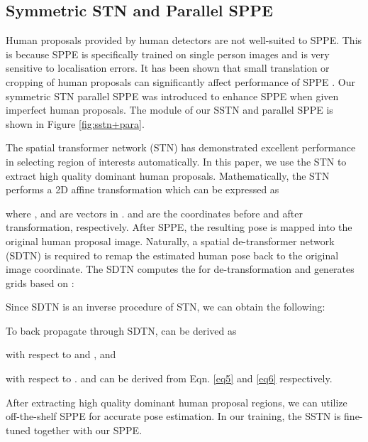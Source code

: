 \documentclass[10pt,twocolumn,letterpaper]{article}
\begin{document}
\subsection{Symmetric STN and Parallel SPPE}
Human proposals provided by human detectors are not well-suited to SPPE. This is because SPPE is specifically trained on single person images and is very sensitive to localisation errors. It has been shown that small translation or cropping of human proposals can significantly affect performance of SPPE \cite{newell2016stacked}. Our symmetric STN  parallel SPPE was introduced to enhance SPPE when given imperfect human proposals. The module of our SSTN and parallel SPPE is shown in Figure \ref{fig:sstn+para}.

\vspace{2mm}
 The spatial transformer network \cite{jaderberg2015spatial}(STN) has demonstrated excellent performance
in selecting region of interests automatically. In this paper, we use the STN to extract high quality dominant human proposals. Mathematically, the STN performs a 2D affine transformation which can be expressed as

where ,  and  are vectors in .  and  are the coordinates before and after transformation, respectively. After SPPE, the resulting pose is mapped into the original human proposal image. Naturally, a spatial de-transformer network (SDTN) is required to remap the estimated human pose back to the original image coordinate. The SDTN computes the  for de-transformation and generates grids based on :
{\small

}
Since SDTN is an inverse procedure of STN, we can obtain the following:
{\small


}
To back propagate through SDTN,  can be derived as
{\small

}
with respect to  and , and
{\small

}
with respect to .
 and
 can be derived from Eqn. \eqref{eq5} and \eqref{eq6} respectively.

After extracting high quality dominant human proposal regions, we can utilize off-the-shelf SPPE for accurate pose estimation. In our training, the SSTN is fine-tuned together with our SPPE.
\end{document}
